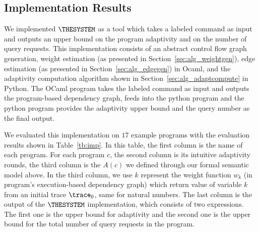 \subsection{Implementation Results}
We implemented $\THESYSTEM$ as a tool which takes a labeled command as input  
and outputs an upper bound on the program adaptivity and on the number of query requests.
This implementation consists of an 
abstract control flow graph generation, weight estimation (as presented in Section~\ref{sec:alg_weightgen}),
edge estimation (as presented in Section~\ref{sec:alg_edgegen}) in Ocaml, 
and the adaptivity computation algorithm shown in Section~\ref{sec:alg_adaptcompute} in Python.
The OCaml program takes the labeled command as input and outputs the program-based dependency graph,
feeds into the python program and the python program provides the adaptivity upper bound and the query number as the final output.

We evaluated this implementation on $17$ example programs with the evaluation results shown  in Table~\ref{tb:imp}.
In this table,
the first column is the name of each program.
For each program $c$, the second column is its intuitive adaptivity rounds,
the third column is the $A(c)$ we defined through our formal semantic model above.
In the third column, we use $k$ represent the weight function $w_k$ (in program's execution-based dependency graph) which return value of variable $k$ 
from an initial trace $\trace_0$, same for natural numbers.
The last column is the output of the $\THESYSTEM$ implementation, which consists of two expressions.
The first one is the upper bound for adaptivity and the second one is the 
upper bound for the total number of query requests in the program.

